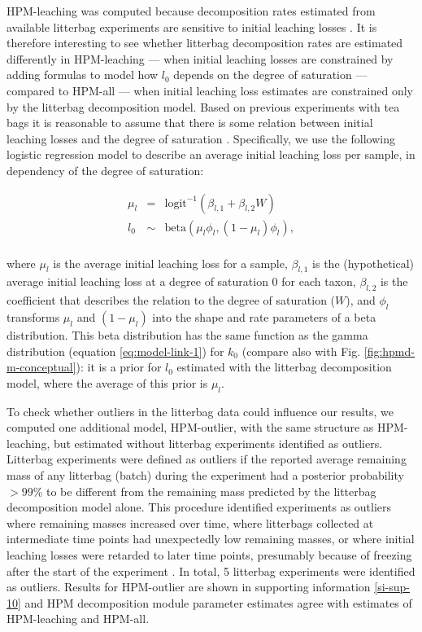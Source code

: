 \documentclass[esd, manuscript]{copernicus}
\begin{document}
HPM-leaching was computed because decomposition rates estimated from available litterbag experiments are sensitive to initial leaching losses \citep{Yu.2001, Lind.2022, Teickner.2025}. It is therefore interesting to see whether litterbag decomposition rates are estimated differently in HPM-leaching --- when initial leaching losses are constrained by adding formulas to model how \(l_0\) depends on the degree of saturation --- compared to HPM-all --- when initial leaching loss estimates are constrained only by the litterbag decomposition model. Based on previous experiments with tea bags it is reasonable to assume that there is some relation between initial leaching losses and the degree of saturation \citep{Lind.2022}. Specifically, we use the following logistic regression model to describe an average initial leaching loss per sample, in dependency of the degree of saturation:

\begin{equation}
\begin{aligned}
\mu_{l} & = & \text{logit}^{-1}(\beta_{l,1} + \beta_{l,2} W)\\
l_0 & \sim & \text{beta}(\mu_{l}\phi_l, (1 - \mu_{l})\phi_l),\\
\end{aligned}
\label{eq:hpm-hpm-l-2}
\end{equation}

where \(\mu_{l}\) is the average initial leaching loss for a sample, \(\beta_{l,1}\) is the (hypothetical) average initial leaching loss at a degree of saturation 0 for each taxon, \(\beta_{l,2}\) is the coefficient that describes the relation to the degree of saturation (\(W\)), and \(\phi_l\) transforms \(\mu_{l}\) and \((1 - \mu_{l})\) into the shape and rate parameters of a beta distribution. This beta distribution has the same function as the gamma distribution (equation \eqref{eq:model-link-1}) for \(k_0\) (compare also with Fig. \ref{fig:hpmd-m-conceptual}): it is a prior for \(l_0\) estimated with the litterbag decomposition model, where the average of this prior is \(\mu_{l}\).

To check whether outliers in the litterbag data could influence our results, we computed one additional model, HPM-outlier, with the same structure as HPM-leaching, but estimated without litterbag experiments identified as outliers. Litterbag experiments were defined as outliers if the reported average remaining mass of any litterbag (batch) during the experiment had a posterior probability \(>99\)\% to be different from the remaining mass predicted by the litterbag decomposition model alone. This procedure identified experiments as outliers where remaining masses increased over time, where litterbags collected at intermediate time points had unexpectedly low remaining masses, or where initial leaching losses were retarded to later time points, presumably because of freezing after the start of the experiment \citep{Teickner.2025}. In total, 5 litterbag experiments were identified as outliers. Results for HPM-outlier are shown in supporting information \ref{si-sup-10} and HPM decomposition module parameter estimates agree with estimates of HPM-leaching and HPM-all.
\end{document}
